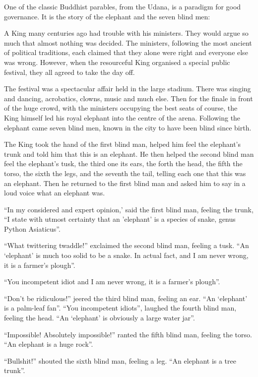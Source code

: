 \documentclass[12pt, openany]{book}
\begin{document}
One of the classic Buddhist parables, from the Udana, is a paradigm for good governance. It is the story of the elephant and the seven blind men:

A King many centuries ago had trouble with his ministers. They would argue so much that almost nothing was decided. The ministers, following the most ancient of political traditions, each claimed that they alone were right and everyone else was wrong. However, when the resourceful King organised a special public festival, they all agreed to take the day off.

The festival was a spectacular affair held in the large stadium. There was singing and dancing, acrobatics, clowns, music and much else. Then for the finale in front of the huge crowd, with the ministers occupying the best seats of course, the King himself led his royal elephant into the centre of the arena. Following the elephant came seven blind men, known in the city to have been blind since birth.

The King took the hand of the first blind man, helped him feel the elephant’s trunk and told him that this is an elephant. He then helped the second blind man feel the elephant’s tusk, the third one its ears, the forth the head, the fifth the torso, the sixth the legs, and the seventh the tail, telling each one that this was an elephant. Then he returned to the first blind man and asked him to say in a loud voice what an elephant was.

“In my considered and expert opinion,’ said the first blind man, feeling the trunk, “I state with utmost certainty that an ’elephant’ is a species of snake, genus Python Asiaticus”.

“What twittering twaddle!” exclaimed the second blind man, feeling a tusk. “An ‘elephant’ is much too solid to be a snake. In actual fact, and I am never wrong, it is a farmer’s plough”.

“You incompetent idiot and I am never wrong, it is a farmer’s plough”.

“Don’t be ridiculous!” jeered the third blind man, feeling an ear. “An ‘elephant’ is a palm-leaf fan”.
“You incompetent idiots”, laughed the fourth blind man, feeling the head. “An ‘elephant’ is obviously a large water jar”.

“Impossible! Absolutely impossible!” ranted the fifth blind man, feeling the torso. “An elephant is a huge rock”.

“Bullshit!” shouted the sixth blind man, feeling a leg. “An elephant is a tree trunk”.
\end{document}
